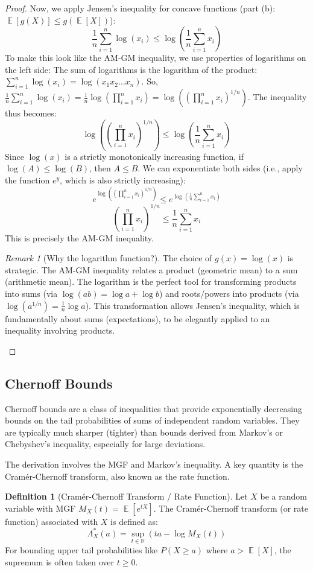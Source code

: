 \documentclass[11pt, letterpaper]{article}
\theoremstyle{plain} %
\theoremstyle{definition} %
\newtheorem{definition}[theorem]{Definition}
\theoremstyle{remark} %
\newtheorem{remark}[theorem]{Remark}
\DeclareMathOperator{\E}{\mathbb{E}}
\newcommand{\R}{\mathbb{R}}
\begin{document}
\begin{proof}
Now, we apply Jensen's inequality for concave functions (part (b): $\E[g(X)] \le g(\E[X])$):
\[ \frac{1}{n}\sum_{i=1}^n \log(x_i) \le \log\left(\frac{1}{n}\sum_{i=1}^n x_i\right) \]
To make this look like the AM-GM inequality, we use properties of logarithms on the left side:
The sum of logarithms is the logarithm of the product: $\sum_{i=1}^n \log(x_i) = \log(x_1 x_2 \dots x_n)$.
So, $\frac{1}{n}\sum_{i=1}^n \log(x_i) = \frac{1}{n}\log\left(\prod_{i=1}^n x_i\right) = \log\left(\left(\prod_{i=1}^n x_i\right)^{1/n}\right)$.
The inequality thus becomes:
\[ \log\left(\left(\prod_{i=1}^n x_i\right)^{1/n}\right) \le \log\left(\frac{1}{n}\sum_{i=1}^n x_i\right) \]
Since $\log(x)$ is a strictly monotonically increasing function, if $\log(A) \le \log(B)$, then $A \le B$. We can exponentiate both sides (i.e., apply the function $e^y$, which is also strictly increasing):
\[ e^{\log\left(\left(\prod_{i=1}^n x_i\right)^{1/n}\right)} \le e^{\log\left(\frac{1}{n}\sum_{i=1}^n x_i\right)} \]
\[ \left(\prod_{i=1}^n x_i\right)^{1/n} \le \frac{1}{n}\sum_{i=1}^n x_i \]
This is precisely the AM-GM inequality.
\begin{remark}[Why the logarithm function?]
    The choice of $g(x) = \log(x)$ is strategic. The AM-GM inequality relates a product (geometric mean) to a sum (arithmetic mean). The logarithm is the perfect tool for transforming products into sums (via $\log(ab) = \log a + \log b$) and roots/powers into products (via $\log(a^{1/n}) = \frac{1}{n}\log a$). This transformation allows Jensen's inequality, which is fundamentally about sums (expectations), to be elegantly applied to an inequality involving products.
\end{remark}
\end{proof}

\subsection{Chernoff Bounds}
\label{subsec:chernoff}

Chernoff bounds are a class of inequalities that provide exponentially decreasing bounds on the tail probabilities of sums of independent random variables. They are typically much sharper (tighter) than bounds derived from Markov's or Chebyshev's inequality, especially for large deviations.

The derivation involves the MGF and Markov's inequality. A key quantity is the Cramér-Chernoff transform, also known as the rate function.

\begin{definition}[Cramér-Chernoff Transform / Rate Function]
Let $X$ be a random variable with MGF $M_X(t) = \E[e^{tX}]$. The Cramér-Chernoff transform (or rate function) associated with $X$ is defined as:
\[ \Lambda_X^*(a) = \sup_{t \in \R} (ta - \log M_X(t)) \]
For bounding upper tail probabilities like $P(X \ge a)$ where $a > \E[X]$, the supremum is often taken over $t \ge 0$.
\end{definition}
\end{document}
